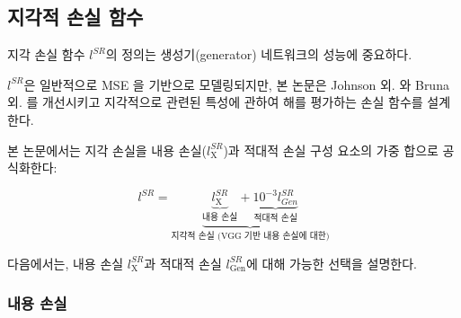 \documentclass[10pt,twocolumn,letterpaper]{article}
\newcommand{\kor}[1]{#1}
\newcommand{\eng}[1]{}
\begin{document}
\subsection{\eng{Perceptual loss function}\kor{지각적 손실 함수}}
\label{sec:losses}
\eng{
The definition of our perceptual loss function $l^{SR}$  is critical for the performance of our generator network.
}\kor{
지각 손실 함수 $l^{SR}$의 정의는 생성기(generator) 네트워크의 성능에 중요하다.
} \eng{
While $l^{SR}$ is commonly modeled based on the \ac{MSE}  \cite{dong2016image,Shi2016ESPCN}, we improve on Johnson et al. \cite{Johnson16PercepLoss} and Bruna et al. \cite{bruna2016super} and design a loss function that assesses a solution with respect to perceptually relevant characteristics.
}\kor{
$l^{SR}$은 일반적으로 \ac{MSE} \cite{dong2016image,Shi2016ESPCN}을 기반으로 모델링되지만, 본 논문은 Johnson 외. \cite{Johnson16PercepLoss}와 Bruna 외. 를 개선시키고 지각적으로 관련된 특성에 관하여 해를 평가하는 손실 함수를 설계한다.
} \eng{
We formulate the perceptual loss as the weighted sum of a content loss ($l^{SR}_\textrm{X}$) and an adversarial loss component as:
}\kor{
본 논문에서는 지각 손실을 내용 손실($l^{SR}_\textrm{X}$)과 적대적 손실 구성 요소의 가중 합으로 공식화한다:
}

\begin{equation}
l^{SR} = \underbrace{\underbrace{l^{SR}_\textrm{X}}_{\text{\eng{content loss}\kor{내용 손실}}} + \underbrace{10^{-3} l^{SR}_{Gen}}_{\text{\eng{adversarial loss}\kor{적대적 손실}}}}_{\text{\eng{perceptual loss (for VGG based content losses)}\kor{지각적 손실 (VGG 기반 내용 손실에 대한)}}}
\end{equation}
\eng{
In the following we describe possible choices for the content loss $l^{SR}_\textrm{X}$ and the adversarial loss $l^{SR}_\textrm{Gen}$.
}\kor{
다음에서는, 내용 손실 $l^{SR}_\textrm{X}$과 적대적 손실 $l^{SR}_\textrm{Gen}$에 대해 가능한 선택을 설명한다.
}

\subsubsection{\eng{Content loss}\kor{내용 손실}}
\end{document}

